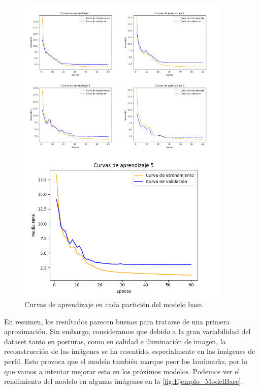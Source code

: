         \begin{figure}[H]
            \centering
            \includegraphics[width=0.9\textwidth]{img/curvas_aprendizaje_modelbase.png}
            \caption{Curvas de aprendizaje en cada partición del modelo base.}
            \label{fig:Curvas_modelbase}
        \end{figure}

        \noindent En resumen, los resultados parecen buenos para tratarse de una primera aproximación. Sin embargo, consideramos que debido a la gran variabilidad del dataset tanto en posturas, como en calidad e iluminación de imagen, la reconstrucción de las imágenes se ha resentido, especialmente en las imágenes de perfil. Esto provoca que el modelo también marque peor los landmarks, por lo que vamos a intentar mejorar esto en los próximos modelos. Podemos ver el rendimiento del modelo en algunas imágenes en la \autoref{fig:Ejemplo_ModelBase}.

